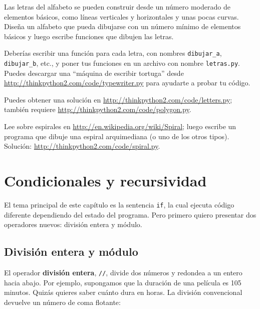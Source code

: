 \documentclass[10pt]{book}
\begin{document}
\begin{exercise}

Las letras del alfabeto se pueden construir desde un número moderado
de elementos básicos, como líneas verticales y horizontales y unas pocas
curvas.  Diseña un alfabeto que pueda dibujarse con un número
mínimo de elementos básicos y luego escribe funciones que dibujen las letras.

Deberías escribir una función para cada letra, con nombres
\verb"dibujar_a", \verb"dibujar_b", etc., y poner tus funciones
en un archivo con nombre {\tt letras.py}.  Puedes descargar una
``máquina de escribir tortuga'' desde \url{http://thinkpython2.com/code/typewriter.py}
para ayudarte a probar tu código.

Puedes obtener una solución en \url{http://thinkpython2.com/code/letters.py};
también requiere
\url{http://thinkpython2.com/code/polygon.py}.

\end{exercise}

\begin{exercise}

Lee sobre espirales en \url{http://en.wikipedia.org/wiki/Spiral}; luego
escribe un programa que dibuje una espiral arquimediana (o uno de los otros
tipos).  Solución: \url{http://thinkpython2.com/code/spiral.py}.

\end{exercise}


\chapter{Condicionales y recursividad}

El tema principal de este capítulo es la sentencia {\tt if}, la cual
ejecuta código diferente dependiendo del estado del programa.
Pero primero quiero presentar dos operadores nuevos: división entera
y módulo.


\section{División entera y módulo}

El operador {\bf división entera}, \verb"//", divide
dos números y redondea a un entero hacia abajo.  Por ejemplo, supongamos que la
duración de una película es 105 minutos.  Quizás quieres saber
cuánto dura en horas.  La división convencional
devuelve un número de coma flotante:
\end{document}
